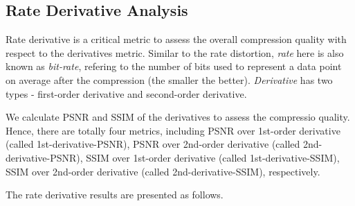 \subsection{Rate Derivative Analysis}

Rate derivative is a critical metric to assess the overall compression quality with respect to the derivatives metric. Similar to the rate distortion, \emph{rate} here is also known as \emph{bit-rate}, refering to the number of bits used to represent a data point on average after the compression (the smaller the better). \emph{Derivative} has two types - first-order derivative and second-order derivative.

We calculate PSNR and SSIM of the derivatives to assess the compressio quality. Hence, there are totally four metrics, including PSNR over 1st-order derivative (called 1st-derivative-PSNR), PSNR over 2nd-order derivative (called 2nd-derivative-PSNR), SSIM over 1st-order derivative (called 1st-derivative-SSIM), SSIM over 2nd-order derivative (called 2nd-derivative-SSIM), respectively.

The rate derivative results are presented as follows.

